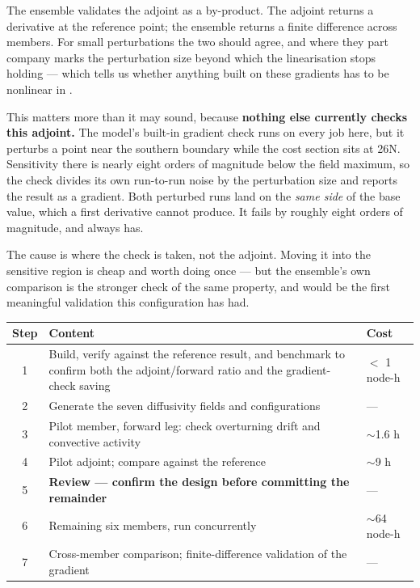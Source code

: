 The ensemble validates the adjoint as a by-product. The adjoint returns a
derivative at the reference point; the ensemble returns a finite difference
across members. For small perturbations the two should agree, and where they
part company marks the perturbation size beyond which the linearisation stops
holding --- which tells us whether anything built on these gradients has to be
nonlinear in \kv.

This matters more than it may sound, because \textbf{nothing else currently
checks this adjoint.} The model's built-in gradient check runs on every job
here, but it perturbs a point near the southern boundary while the cost section
sits at 26\dg N. Sensitivity there is nearly eight orders of magnitude below the
field maximum, so the check divides its own run-to-run noise by the perturbation
size and reports the result as a gradient. Both perturbed runs land on the
\emph{same side} of the base value, which a first derivative cannot produce. It
fails by roughly eight orders of magnitude, and always has.

The cause is where the check is taken, not the adjoint. Moving it into the
sensitive region is cheap and worth doing once --- but the ensemble's own
comparison is the stronger check of the same property, and would be the first
meaningful validation this configuration has had.


\smallskip
\begin{tabularx}{\textwidth}{@{}cY{1.85}Y{0.45}@{}}
\toprule
\textbf{Step} & \textbf{Content} & \textbf{Cost}\\
 & Build, verify against the reference result, and benchmark to confirm both
    the adjoint/forward ratio and the gradient-check saving & $<$ 1 node-h\\
2 & Generate the seven diffusivity fields and configurations & ---\\
3 & Pilot member, forward leg: check overturning drift and convective activity
  & $\sim$1.6 h\\
4 & Pilot adjoint; compare against the reference & $\sim$9 h\\
5 & \textbf{Review --- confirm the design before committing the remainder}
  & ---\\
6 & Remaining six members, run concurrently & $\sim$64 node-h\\
7 & Cross-member comparison; finite-difference validation of the gradient
  & ---\\
\bottomrule
\end{tabularx}
\smallskip

